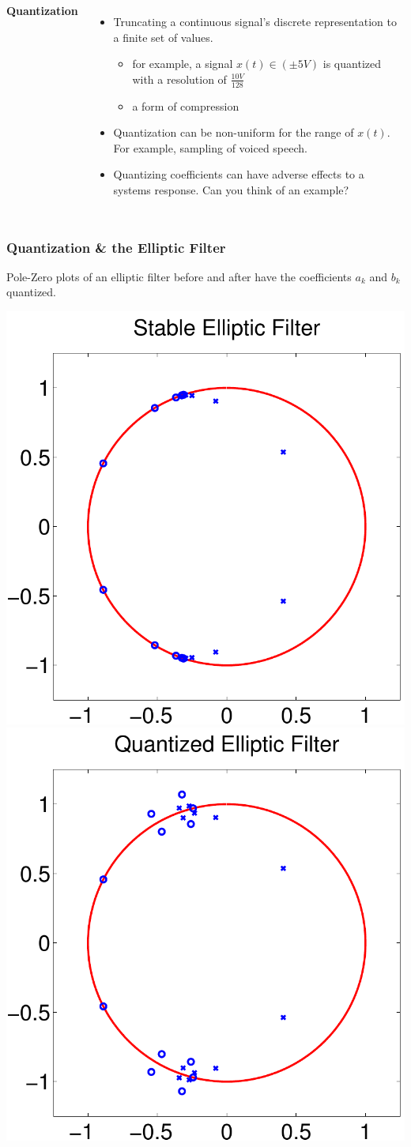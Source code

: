 \documentclass[mathserif,9pt]{beamer}
\begin{document}
\begin{frame}
\begin{columns}
    {\color{blue!50!black}\bf Quantization}
    \begin{itemize}
      \item Truncating a continuous signal's discrete representation to a finite set of values. 
        \begin{itemize}
          \item for example, a signal $x(t) \in (\pm 5V)$ is quantized with a resolution of $\frac{10V}{128}$
          \item a form of compression
        \end{itemize} 
      \item Quantization can be  non-uniform for the range of $x(t)$. For example, sampling of voiced speech. 
      \item Quantizing coefficients can have adverse effects to a systems response. Can you think of an example?
    \end{itemize}
  \end{columns}
\end{frame}

\begin{frame}\frametitle{Quantization \& the Elliptic Filter}\small
  \begin{center}
    Pole-Zero plots of an elliptic filter before and after have the coefficients $a_k$ and 
    $b_k$ quantized. \\
    \vspace{1em}
    
    \includegraphics[width=.45\textwidth]{ellip_pz_stable.pdf} \hspace{1em}
    \includegraphics[width=.45\textwidth]{ellip_pz_unstable.pdf}
  \end{center}
\end{frame}
\end{document}
